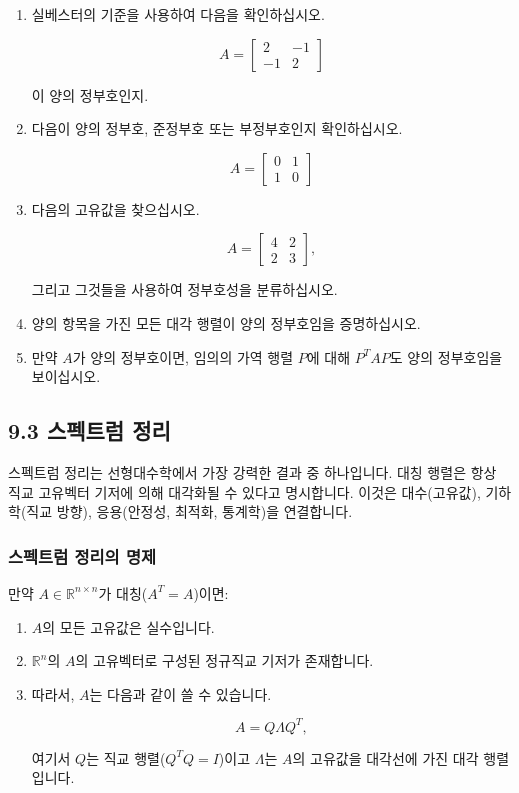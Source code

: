 \documentclass[
  12pt,
  a4paper,
]{article}
\begin{document}
\begin{enumerate}
\def\labelenumi{\arabic{enumi}.}
\item
  실베스터의 기준을 사용하여 다음을 확인하십시오.

  \[A = \begin{bmatrix} 2 & -1 \\ -1 & 2 \end{bmatrix}\]

  이 양의 정부호인지.
\item
  다음이 양의 정부호, 준정부호 또는 부정부호인지 확인하십시오.

  \[A = \begin{bmatrix} 0 & 1 \\ 1 & 0 \end{bmatrix}\]
\item
  다음의 고유값을 찾으십시오.

  \[A = \begin{bmatrix} 4 & 2 \\ 2 & 3 \end{bmatrix},\]

  그리고 그것들을 사용하여 정부호성을 분류하십시오.
\item
  양의 항목을 가진 모든 대각 행렬이 양의 정부호임을 증명하십시오.
\item
  만약 \(A\)가 양의 정부호이면, 임의의 가역 행렬 \(P\)에 대해 \(P^T A P\)도 양의 정부호임을 보이십시오.
\end{enumerate}

\subsection{9.3 스펙트럼 정리}\label{93-spectral-theorem}

스펙트럼 정리는 선형대수학에서 가장 강력한 결과 중 하나입니다. 대칭 행렬은 항상 직교 고유벡터 기저에 의해 대각화될 수 있다고 명시합니다. 이것은 대수(고유값), 기하학(직교 방향), 응용(안정성, 최적화, 통계학)을 연결합니다.

\subsubsection{스펙트럼 정리의 명제}\label{statement-of-the-spectral-theorem}

만약 \(A \in \mathbb{R}^{n \times n}\)가 대칭(\(A^T = A\))이면:

\begin{enumerate}
\def\labelenumi{\arabic{enumi}.}
\item
  \(A\)의 모든 고유값은 실수입니다.
\item
  \(\mathbb{R}^n\)의 \(A\)의 고유벡터로 구성된 정규직교 기저가 존재합니다.
\item
  따라서, \(A\)는 다음과 같이 쓸 수 있습니다.

  \[A = Q \Lambda Q^T,\]

  여기서 \(Q\)는 직교 행렬(\(Q^T Q = I\))이고 \(\Lambda\)는 \(A\)의 고유값을 대각선에 가진 대각 행렬입니다.
\end{enumerate}
\end{document}
